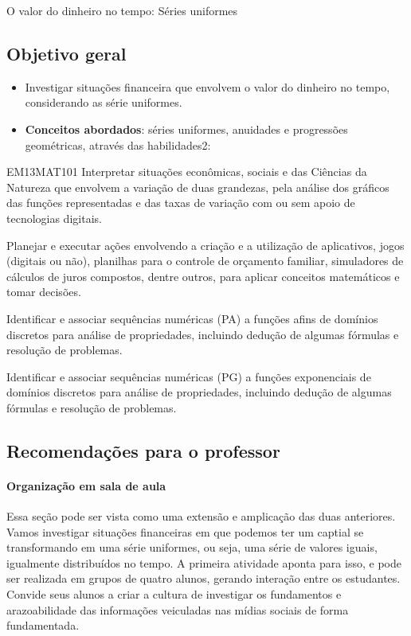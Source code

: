 \begin{paginatexto}{O valor do dinheiro no tempo: Séries uniformes}

\subsection*{Objetivo geral}
\begin{itemize}
\item Investigar situações financeira que envolvem o valor do dinheiro no tempo, considerando as série uniformes.

\item \textbf{Conceitos abordados}: séries uniformes, anuidades e progressões geométricas, através das habilidades2:
\end{itemize}

\begin{habilities}{EM13MAT101}
 Interpretar situações econômicas, sociais e das Ciências da Natureza
que envolvem a variação de duas grandezas, pela análise dos gráficos das funções representadas e das taxas de variação com ou sem apoio de tecnologias digitais.

Planejar e executar ações envolvendo a criação e a utilização de aplicativos, jogos (digitais ou não), planilhas para o controle de orçamento familiar, simuladores de cálculos de juros compostos, dentre outros, para aplicar conceitos matemáticos e tomar decisões. 

Identificar e associar sequências numéricas (PA) a funções afins de domínios discretos para análise de propriedades, incluindo dedução de algumas fórmulas e resolução de problemas.

Identificar e associar sequências numéricas (PG) a funções exponenciais de domínios discretos para análise de propriedades, incluindo dedução de algumas fórmulas e resolução de problemas.
\end{habilities}

\subsection*{Recomendações para o professor}
\vspace{-1em}
\paragraph{Organização em sala de aula} Essa seção pode ser vista como uma extensão e amplicação das duas anteriores. Vamos investigar situações financeiras em que podemos ter um captial se transformando em uma série uniformes, ou seja, uma série de valores iguais, igualmente distribuídos no tempo. A primeira atividade aponta para isso, e pode ser realizada em grupos de quatro alunos, gerando interação entre os estudantes. Convide seus alunos a criar a cultura de investigar os fundamentos e arazoabilidade das informações veiculadas nas mídias sociais de forma fundamentada.


\end{paginatexto}
